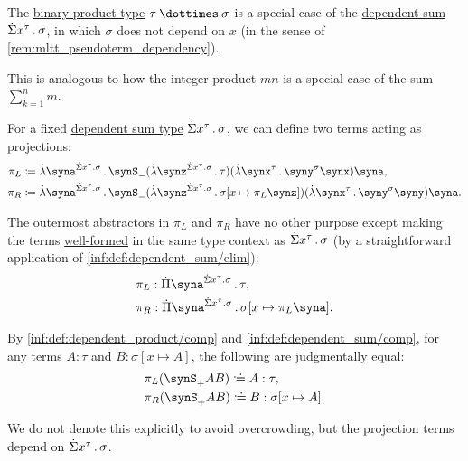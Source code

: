 \begin{remark}\label{rem:dependent_sum_as_binary_product}
  The \hyperref[def:simple_product_type]{binary product type} \( \tau \syntimes \sigma \) is a special case of the \hyperref[def:dependent_product]{dependent sum} \( \qsum {x^\tau} \sigma \), in which \( \sigma \) does not depend on \( x \) (in the sense of \cref{rem:mltt_pseudoterm_dependency}).

  This is analogous to how the integer product \( mn \) is a special case of the sum \( \sum_{k=1}^n m \).
\end{remark}

\begin{definition}\label{def:dependent_sum_projections}\mimprovised
  For a fixed \hyperref[def:dependent_sum]{dependent sum type} \( \qsum {x^\tau} \sigma \), we can define two terms acting as projections:
  \begin{align*}
    \pi_L &\coloneqq \qabs {\syna^{\qsum {x^\tau} \sigma}} \synS_- (\qabs {\synz^{\qsum {x^\tau} \sigma}} \tau) (\qabs {\synx^\tau} {\syny^\sigma} \synx) \syna, \\
    \pi_R &\coloneqq \qabs {\syna^{\qsum {x^\tau} \sigma}} \synS_- (\qabs {\synz^{\qsum {x^\tau} \sigma}} \sigma[x \mapsto \pi_L \synz]) (\qabs {\synx^\tau} {\syny^\sigma} \syny) \syna.
  \end{align*}

  The outermost abstractors in \( \pi_L \) and \( \pi_R \) have no other purpose except making the terms \hyperref[def:mltt_well_formed_context/type]{well-formed} in the same type context as \( \qsum {x^\tau} \sigma \) (by a straightforward application of \ref{inf:def:dependent_sum/elim}):
  \begin{align*}
    &\pi_L: \qprod {\syna^{\qsum {x^\tau} \sigma}} \tau, \\
    &\pi_R: \qprod {\syna^{\qsum {x^\tau} \sigma}} \sigma[x \mapsto \pi_L \syna].
  \end{align*}

  By \ref{inf:def:dependent_product/comp} and \ref{inf:def:dependent_sum/comp}, for any terms \( A: \tau \) and \( B: \sigma[x \mapsto A] \), the following are judgmentally equal:
  \begin{align*}
    &\pi_L (\synS_+ A B) \syndefeq A: \tau, \\
    &\pi_R (\synS_+ A B) \syndefeq B: \sigma[x \mapsto A].
  \end{align*}
\end{definition}
\begin{comments}
  \item We do not denote this explicitly to avoid overcrowding, but the projection terms depend on \( \qsum {x^\tau} \sigma \).
\end{comments}

